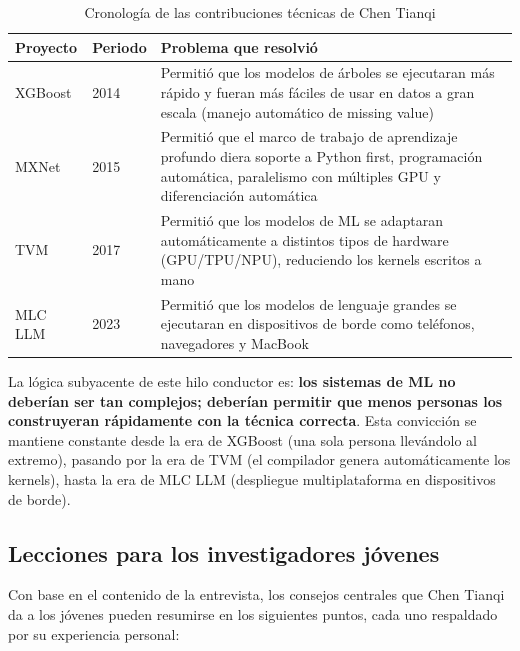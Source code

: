 \documentclass[a4paper]{article}
\begin{document}
\begin{table}[H]
\centering
\begin{tabular}{p{2.2cm}p{1.8cm}p{9cm}}
\toprule
\textbf{Proyecto} & \textbf{Periodo} & \textbf{Problema que resolvió} \\
\midrule
XGBoost & 2014 & Permitió que los modelos de árboles se ejecutaran más rápido y fueran más fáciles de usar en datos a gran escala (manejo automático de missing value) \\
MXNet & 2015 & Permitió que el marco de trabajo de aprendizaje profundo diera soporte a Python first, programación automática, paralelismo con múltiples GPU y diferenciación automática \\
TVM & 2017 & Permitió que los modelos de ML se adaptaran automáticamente a distintos tipos de hardware (GPU/TPU/NPU), reduciendo los kernels escritos a mano \\
MLC LLM & 2023 & Permitió que los modelos de lenguaje grandes se ejecutaran en dispositivos de borde como teléfonos, navegadores y MacBook \\
\bottomrule
\end{tabular}
\caption{Cronología de las contribuciones técnicas de Chen Tianqi}
\end{table}

La lógica subyacente de este hilo conductor es: \textbf{los sistemas de ML no deberían ser tan complejos; deberían permitir que menos personas los construyeran rápidamente con la técnica correcta}. Esta convicción se mantiene constante desde la era de XGBoost (una sola persona llevándolo al extremo), pasando por la era de TVM (el compilador genera automáticamente los kernels), hasta la era de MLC LLM (despliegue multiplataforma en dispositivos de borde).

\subsection{Lecciones para los investigadores jóvenes}

Con base en el contenido de la entrevista, los consejos centrales que Chen Tianqi da a los jóvenes pueden resumirse en los siguientes puntos, cada uno respaldado por su experiencia personal:
\end{document}

